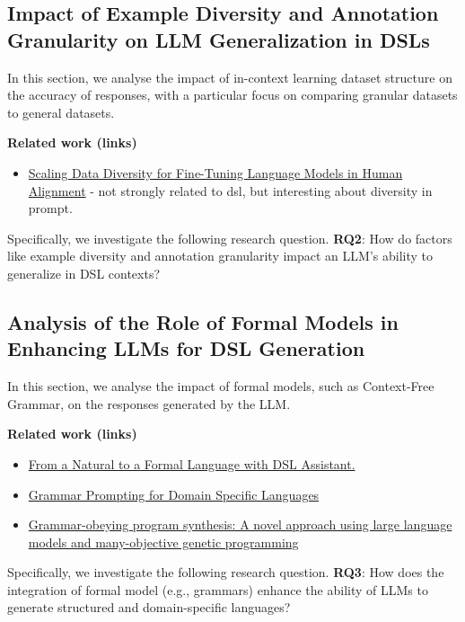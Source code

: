 \subsection{Impact of Example Diversity and Annotation Granularity on LLM Generalization in DSLs}
In this section, we analyse the impact of in-context learning dataset structure on the accuracy of responses, with a particular focus on comparing granular datasets to general datasets.

\textbf{Related work (links)}
\begin{itemize}
    \item \href{http://www.lrec-conf.org/proceedings/lrec-coling-2024/pdf/2024.main-1.1251.pdf}{Scaling Data Diversity for Fine-Tuning Language Models in Human Alignment} - not strongly related to dsl, but interesting about diversity in prompt.
\end{itemize}

Specifically, we investigate the following research question. \textbf{RQ2}: How do factors like example diversity and annotation granularity impact an LLM’s ability to generalize in DSL contexts?

\subsection{Analysis of the Role of Formal Models in Enhancing LLMs for DSL Generation}

In this section, we analyse the impact of formal models, such as Context-Free Grammar, on the responses generated by the LLM.

\textbf{Related work (links)}
\begin{itemize}
    \item \href{https://dl.acm.org/doi/10.1145/3652620.3687811}{From a Natural to a Formal Language with DSL Assistant.}
    \item \href{https://proceedings.neurips.cc/paper_files/paper/2023/file/cd40d0d65bfebb894ccc9ea822b47fa8-Paper-Conference.pdf}{Grammar Prompting for Domain Specific Languages}
    \item \href{https://www.sciencedirect.com/science/article/abs/pii/S0920548924001077}{Grammar-obeying program synthesis: A novel approach using large language models and many-objective genetic programming}

\end{itemize}

Specifically, we investigate the following research question. \textbf{RQ3}: How does the integration of formal model (e.g., grammars) enhance the ability of LLMs to generate structured and domain-specific languages?
